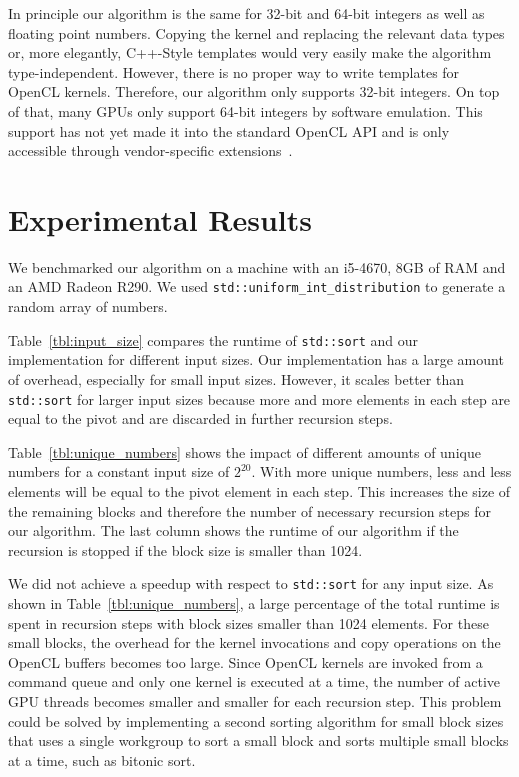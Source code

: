 \documentclass{llncs}
\begin{document}
In principle our algorithm is the same for 32-bit and 64-bit integers as well as floating point numbers. Copying the kernel and replacing the relevant data types or, more elegantly, C++-Style templates would very easily make the algorithm type-independent. However, there is no proper way to write templates for OpenCL kernels. Therefore, our algorithm only supports 32-bit integers. On top of that, many GPUs only support 64-bit integers by software emulation. This support has not yet made it into the standard OpenCL API and is only accessible through vendor-specific extensions~\cite{opencl_64bit}.

\section{Experimental Results}

We benchmarked our algorithm on a machine with an i5-4670, 8GB of RAM and an AMD Radeon R290. We used \texttt{std::uniform\_int\_distribution} to generate a random array of numbers.

Table~\ref{tbl:input_size} compares the runtime of \texttt{std::sort} and our implementation for different input sizes. Our implementation has a large amount of overhead, especially for small input sizes. However, it scales better than \texttt{std::sort} for larger input sizes because more and more elements in each step are equal to the pivot and are discarded in further recursion steps.

Table~\ref{tbl:unique_numbers} shows the impact of different amounts of unique numbers for a constant input size of $2^{20}$. With more unique numbers, less and less elements will be equal to the pivot element in each step. This increases the size of the remaining blocks and therefore the number of necessary recursion steps for our algorithm. The last column shows the runtime of our algorithm if the recursion is stopped if the block size is smaller than 1024.

We did not achieve a speedup with respect to \texttt{std::sort} for any input size. As shown in Table~\ref{tbl:unique_numbers}, a large percentage of the total runtime is spent in recursion steps with block sizes smaller than 1024 elements. For these small blocks, the overhead for the kernel invocations and copy operations on the OpenCL buffers becomes too large. Since OpenCL kernels are invoked from a command queue and only one kernel is executed at a time, the number of active GPU threads becomes smaller and smaller for each recursion step. This problem could be solved by implementing a second sorting algorithm for small block sizes that uses a single workgroup to sort a small block and sorts multiple small blocks at a time, such as bitonic sort. 
\end{document}
